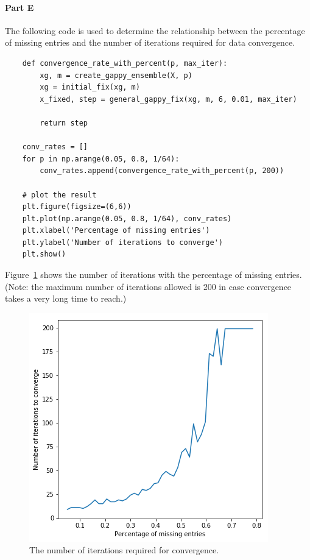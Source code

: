 \documentclass{article}
\begin{document}
\paragraph{Part E} The following code is used to determine the relationship between the percentage of missing entries and the number of iterations required for data convergence. 
\begin{lstlisting}
	def convergence_rate_with_percent(p, max_iter):
		xg, m = create_gappy_ensemble(X, p)
		xg = initial_fix(xg, m)
		x_fixed, step = general_gappy_fix(xg, m, 6, 0.01, max_iter)
		
		return step

	conv_rates = []
	for p in np.arange(0.05, 0.8, 1/64):
		conv_rates.append(convergence_rate_with_percent(p, 200))
		
	# plot the result
	plt.figure(figsize=(6,6))
	plt.plot(np.arange(0.05, 0.8, 1/64), conv_rates)
	plt.xlabel('Percentage of missing entries')
	plt.ylabel('Number of iterations to converge')
	plt.show()
\end{lstlisting}
Figure~\ref{fig:convergence_step} shows the number of iterations with the percentage of missing entries. (Note: the maximum number of iterations allowed is 200 in case convergence takes a very long time to reach.)
\begin{figure}[h!]
\centering
\includegraphics[width=0.7\linewidth]{images/2_e.png}
\caption{The number of iterations required for convergence.}
\label{fig:convergence_step}
\end{figure}
\end{document}
